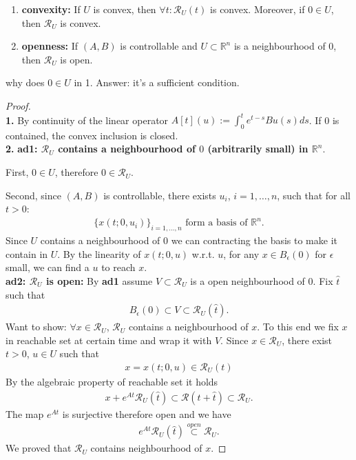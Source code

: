 \begin{lemma}
\quad
	\begin{enumerate}
		\item \textbf{convexity: }If $U$ is convex, then $\forall t : \mathcal{R}_U(t)$ is convex. Moreover, if $0 \in U$, then $\mathcal{R}_U$ is convex. 
		\item \textbf{openness: }If $(A, B)$ is controllable and $U \subset \mathbb{R}^n$ is a neighbourhood of 0, then $\mathcal{R}_U$ is open. 
	\end{enumerate}
\end{lemma}
\begin{remark}
why does $0 \in U$ in 1. Answer: it's a sufficient condition. 
\end{remark}


\begin{proof}
	\quad\\
	\textbf{1.} By continuity of the linear operator $A[t](u):= \int_0^t e^{t - s} B u(s) ds$. If 0 is contained, the convex inclusion is closed. \\
	\textbf{2.} \textbf{ad1: $\mathcal{R}_U$ contains a neighbourhood of $0$ (arbitrarily small) in $\mathbb{R}^n$}. \par 
	First, $0 \in U$, therefore $0 \in \mathcal{R}_U$. \par 
	Second, since $(A, B)$ is controllable, there exists $u_i$, $i= 1, \dots, n$, such that for all $t > 0$:
	\begin{align*}
		\{x(t;0,u_i) \}_{i = 1, \dots, n} \text{ form a basis of $\mathbb{R}^n$.}
	\end{align*}
	Since $U$ contains a neighbourhood of $0$ we can contracting the basis to make it contain in $U$. By the linearity of $x(t;0, u)$ w.r.t. $u$, for any $x \in B_\epsilon(0)$ for $\epsilon$ small, we can find a $u$ to reach $x$. \\
	\textbf{ad2: $\mathcal{R}_U$ is open:} By \textbf{ad1} assume $V \subset \mathcal{R}_U$ is a open neighbourhood of $0$. Fix $\hat{t}$ such that 
	\begin{align*}
		B_\epsilon(0) \subset V \subset  \mathcal{R}_U(\hat{t}).
	\end{align*}
	Want to show: $\forall x \in \mathcal{R}_U$, $\mathcal{R}_U$ contains a neighbourhood of $x$. To this end we fix $x$ in reachable set at certain time and wrap it with $V$. Since $x \in \mathcal{R}_U$, there exist $t >0$, $u \in U$ such that
	\begin{align*}
		x = x(t; 0, u) \in \mathcal{R}_U(t)
	\end{align*}
	By the algebraic property of reachable set it holds
	\begin{align*}
		x + e^{At} \mathcal{R}_U(\hat{t}) \subset \mathcal{R}(t + \hat{t}) \subset \mathcal{R}_U. 
	\end{align*}
	The map $e^{At}$ is surjective therefore open and we have 
	\begin{align*}
		e^{At} \mathcal{R}_U(\hat{t}) \overset{open}{\subset} \mathcal{R}_U. 
	\end{align*}
	We proved that $\mathcal{R}_U$ contains neighbourhood of $x$. 
\end{proof}

